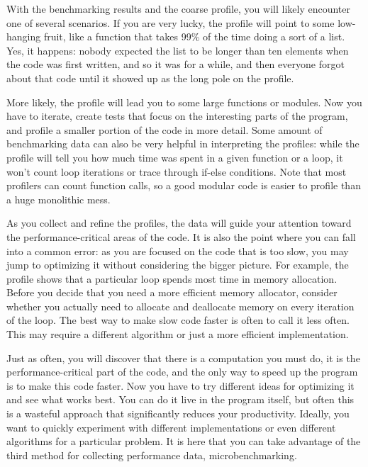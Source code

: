 With the benchmarking results and the coarse profile, you will likely encounter one of several scenarios. If you are very lucky, the profile will point to some low-hanging fruit, like a function that takes 99\% of the time doing a sort of a list. Yes, it happens: nobody expected the list to be longer than ten elements when the code was first written, and so it was for a while, and then everyone forgot about that code until it showed up as the long pole on the profile.

More likely, the profile will lead you to some large functions or modules. Now you have to iterate, create tests that focus on the interesting parts of the program, and profile a smaller portion of the code in more detail. Some amount of benchmarking data can also be very helpful in interpreting the profiles: while the profile will tell you how much time was spent in a given function or a loop, it won't count loop iterations or trace through if-else conditions. Note that most profilers can count function calls, so a good modular code is easier to profile than a huge monolithic mess.

As you collect and refine the profiles, the data will guide your attention toward the performance-critical areas of the code. It is also the point where you can fall into a common error: as you are focused on the code that is too slow, you may jump to optimizing it without considering the bigger picture. For example, the profile shows that a particular loop spends most time in memory allocation. Before you decide that you need a more efficient memory allocator, consider whether you actually need to allocate and deallocate memory on every iteration of the loop. The best way to make slow code faster is often to call it less often. This may require a different algorithm or just a more efficient implementation.

Just as often, you will discover that there is a computation you must do, it is the performance-critical part of the code, and the only way to speed up the program is to make this code faster. Now you have to try different ideas for optimizing it and see what works best. You can do it live in the program itself, but often this is a wasteful approach that significantly reduces your productivity. Ideally, you want to quickly experiment with different implementations or even different algorithms for a particular problem. It is here that you can take advantage of the third method for collecting performance data, microbenchmarking.













